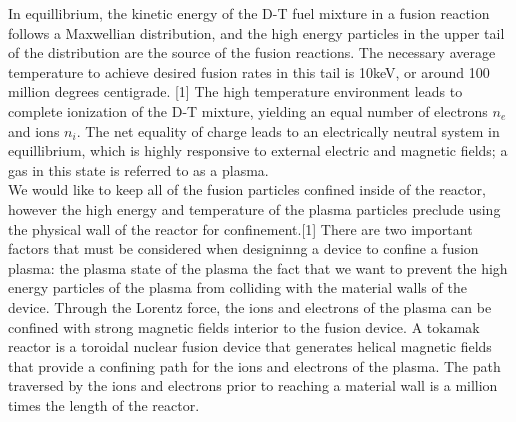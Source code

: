 \documentclass{article}
\begin{document}
 In equillibrium, the kinetic energy of the D-T fuel mixture in a fusion reaction follows a Maxwellian distribution, and the high energy particles in the upper tail of the distribution are the source of the fusion reactions. The necessary average temperature to achieve desired fusion rates in this tail is 10keV, or around 100 million degrees centigrade. [1] The high temperature environment leads to complete ionization of the D-T mixture, yielding an equal number of electrons $n_e$ and ions $n_i$. The net equality of charge leads to an electrically neutral system in equillibrium, which is highly responsive to external electric and magnetic fields; a gas in this state is referred to as a plasma.\\
We would like to keep all of the fusion particles confined inside of the reactor, however the high energy and temperature of the plasma particles preclude using the physical wall of the reactor for confinement.[1] There are two important factors that must be considered when designinng a device to confine a fusion plasma: the plasma state of the plasma the fact that we want to prevent the high energy particles of the plasma from colliding with the material walls of the device. Through the Lorentz force, the ions and electrons of the plasma can be confined with strong magnetic fields interior to the fusion device. A tokamak reactor is a toroidal nuclear fusion device that generates helical magnetic fields that provide a confining path for the ions and electrons of the plasma. The path traversed by the ions and electrons prior to reaching a material wall is a million times the length of the reactor.\\
\newline
\end{document}
